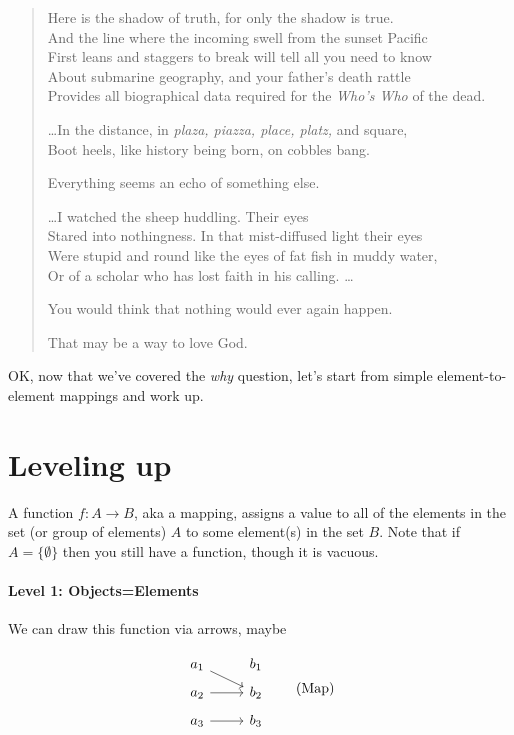 \documentclass[11pt]{article}
\begin{document}
\begin{verse}
Here is the shadow of truth, for only the shadow is true.\\
And the line where the incoming swell from the sunset Pacific\\
First leans and staggers to break will tell all you need to know\\
About submarine geography, and your father's death rattle\\
Provides all biographical data required for the {\em Who's Who} of the dead.

\dots In the distance, in {\em plaza, piazza, place, platz,} and square,\\
Boot heels, like history being born, on cobbles bang.

Everything seems an echo of something else.

\dots I watched the sheep huddling.  Their eyes\\
Stared into nothingness.  In that mist-diffused light their eyes\\
Were stupid and round like the eyes of fat fish in muddy water,\\
Or of a scholar who has lost faith in his calling. \dots

You would think that nothing would ever again happen.

That may be a way to love God.
\end{verse}

OK, now that we've covered the {\em why} question, let's start from simple element-to-element
mappings and work up.

\section{Leveling up}\label{levelsec}

A function $f:A\to B$, aka a mapping, assigns a value to all of the elements in the set (or group of
elements) $A$ to
some element(s) in the set $B$. Note that if $A=\{\emptyset\}$ then you still have a function, though
it is vacuous.

\paragraph{Level 1: Objects=Elements}
We can draw this function via arrows, maybe

\begin{equation}
\begin{tikzcd}[row sep=tiny]
    a_1 \ar[rd] & b_1\\
    a_2 \ar[r] & b_2\\
    a_3 \ar[r] & b_3
\end{tikzcd}\tag{Map}
\end{equation}
\end{document}
